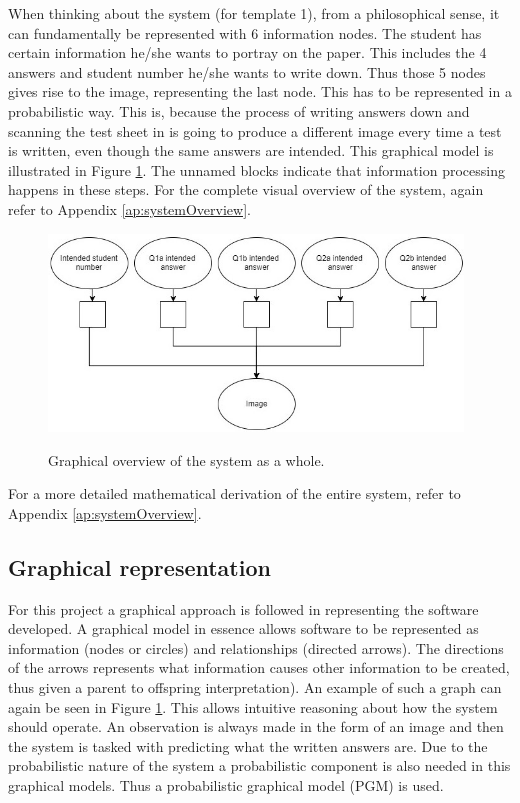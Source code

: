 When thinking about the system (for template 1), from a philosophical sense, it can fundamentally be represented with 6 information nodes. The student has certain information he/she wants to portray on the paper. This includes the 4 answers and student number he/she wants to write down. Thus those 5 nodes gives rise to the image, representing the last node. This has to be represented in a probabilistic way. This is, because the process of writing answers down and scanning the test sheet in is going to produce a different image every time a test is written, even though the same answers are intended. This graphical model is illustrated in Figure \ref{fig:systemOverview}. The unnamed blocks indicate that information processing happens in these steps. For the complete visual overview of the system, again refer to Appendix \ref{ap:systemOverview}.
\begin{figure}
  \centering
  \includegraphics[width=11cm]{systemOverview}\\
  \caption{Graphical overview of the system as a whole.}
  \label{fig:systemOverview}
\end{figure}


For a more detailed mathematical derivation of the entire system, refer to Appendix \ref{ap:systemOverview}.

\subsection{Graphical representation}

For this project a graphical approach is followed in representing the software developed. A graphical model in essence allows software to be represented as information (nodes or circles) and relationships (directed arrows). The directions of the arrows represents what information causes other information to be created, thus given a parent to offspring interpretation). An example of such a graph can again be seen in Figure \ref{fig:systemOverview}. This allows intuitive reasoning about how the system should operate. An observation is always made in the form of an image and then the system is tasked with predicting what the written answers are. Due to the probabilistic nature of the system a probabilistic component is also needed in this graphical models. Thus a probabilistic graphical model (PGM) is used.

